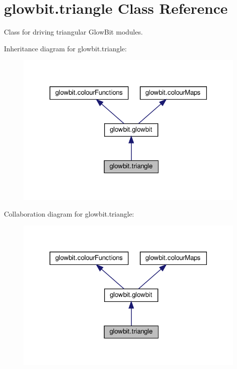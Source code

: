 \hypertarget{classglowbit_1_1triangle}{}\section{glowbit.\+triangle Class Reference}
\label{classglowbit_1_1triangle}


Class for driving triangular Glow\+Bit modules.  




Inheritance diagram for glowbit.\+triangle\+:\nopagebreak
\begin{figure}[H]
\begin{center}
\leavevmode
\includegraphics[width=318pt]{classglowbit_1_1triangle__inherit__graph}
\end{center}
\end{figure}


Collaboration diagram for glowbit.\+triangle\+:\nopagebreak
\begin{figure}[H]
\begin{center}
\leavevmode
\includegraphics[width=318pt]{classglowbit_1_1triangle__coll__graph}
\end{center}
\end{figure}

